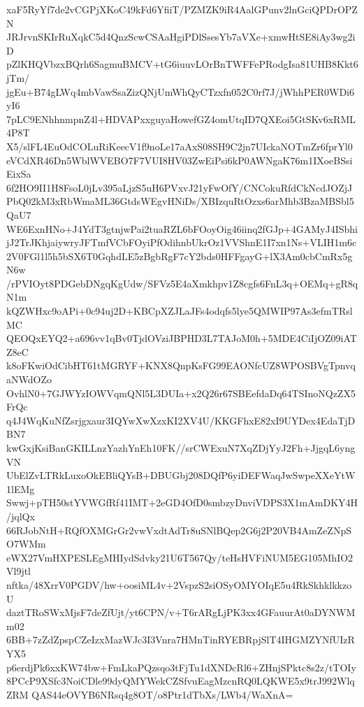 xaF5RyYf7de2vCGPjXKoC49kFd6YfiiT/PZMZK9iR4AalGPunv2lnGciQPDrOPZN
JRJrvnSKIrRuXqkC5d4QnzScwCSAaHgiPDlSsesYb7aVXe+xmwHtSE8iAy3wg2iD
pZlKHQVbzxBQrh6SagmuBMCV+tG6iuuvLOrBnTWFFePRodgIsa81UHB8Kkt6jTm/
jgEu+B74gLWq4mbVawSsaZizQNjUmWhQyCTzxfn052C0rf7J/jWhhPER0WDi6yI6
7pLC9ENhhnmpnZ4l+HDVAPxxguyaHowefGZ4omUtqID7QXEoi5GtSKv6xRML4P8T
X5/slFL4EuOdCOLuRiKeecV1f9noLe17aAxS08SH9C2jn7UIckaNOTmZr6fprYl0
eVCdXR46Dn5WblWVEBO7F7VUI8HV03ZwEiPsi6kP0AWNgaK76m1IXoeBSsiEixSa
6f2HO9II1H8FsoL0jLv395aLjzS5uH6PVxvJ21yFwOfY/CNCokuRfdCkNcdJOZjJ
PbQ02kM3xRbWmaML36GtdsWEgvHNiDs/XBIzquRtOzxs6arMhb3BzaMBSbl5QaU7
WE6ExnHNo+J4YdT3gtnjwPai2tuaRZL6bFOoyOig46iinq2fGJp+4GAMyJ4ISbhi
jJ2TrJKhjaiywryJFTmfVCbFOyiPfOdihnbUkrOz1VVShnE1I7xn1Ns+VLIH1m6c
2V0FGl1l5h5bSX6T0GqhdLE5zBgbRgF7cY2bds0HFFgayG+lX3Am0cbCmRx5gN6w
/rPVIOyt8PDGebDNgqKgUdw/SFVz5E4aXmkhpv1Z8cgfs6FnL3q+OEMq+gR8qN1m
kQZWHxc9oAPi+0c94uj2D+KBCpXZJLaJFs4odqfs5lye5QMWIP97As3efmTRslMC
QEOQxEYQ2+a696vv1qBv0TjdOVziJBPHD3L7TAJoM0h+5MDE4CiIjOZ09iATZ8eC
k8oFKwiOdCibHT61tMGRYF+KNX8QnpKsFG99EAONfcUZ8WPOSBVgTpnvqaNWdOZo
OvhlN0+7GJWYzIOWVqmQNl5L3DUIa+x2Q26r67SBEefdaDq64TSInoNQzZX5FrQc
q4J4WqKuNfZsrjgxaur3IQYwXwXzxKI2XV4U/KKGFhxE82xI9UYDex4EdaTjDBN7
kwGxjKsiBanGKILLnzYazhYnEh10FK//srCWExuN7XqZDjYyJ2Fh+JjgqL6yngVN
UbElZvLTRkLuxoOkEBliQYsB+DBUGbj208DQfP6yiDEFWaqJwSwpeXXeYtW1lEMg
Swwj+pTH50stYVWGfRf41IMT+2eGD4OfD0smbzyDnviVDPS3X1mAmDKY4H/jqlQx
66RJobNtH+RQfOXMGrGr2vwVxdtAdTr8uSNlBQep2G6j2P20VB4AmZeZNpSO7WMm
eWX27VmHXPESLEgMHIydSdvky21U6T567Qy/teHsHVFiNUM5EG105MhIO2Vl9jtl
nftka/48XrrV0PGDV/hw+oosiML4v+2VspzS2siOSyOMYOIqE5u4RkSkhklkkzoU
daztTRoSWxMjsF7deZfUjt/yt6CPN/v+T6rARgLjPK3xx4GFauurAt0aDYNWMm02
6BB+7zZdZpspCZeIzxMazWJc3I3Vnra7HMnTinRYEBRpjSlT4IHGMZYNfUIzRYX5
p6erdjPk6xxKW74bw+FmLkaPQzsqo3tFjTu1dXNDcRl6+ZHnjSPktc8s2z/tTOIy
8PCcP9XSfc3NoiCDle99dyQMYWekCZSfvuEagMzcnRQ0LQKWE5x9trJ992WlqZRM
QAS44eOVYB6NRsq4g8OT/o8Ptr1dTbXs/LWb4/WaXnA=
